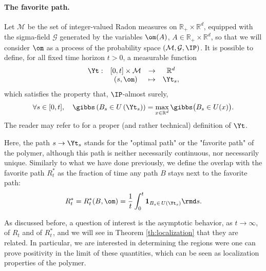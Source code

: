 \medskip
\paragraph{The favorite path.}
Let $\mathcal{M}$ be the set of integer-valued Radon measures on $\mathbb{R}_+\times \mathbb{R}^d$, equipped with the sigma-field $\mathcal G$ generated by the variables $\om(A)$, $A\in \mathbb{R}_+\times \mathbb{R}^d$, so that we will consider $\om$ as a process of the probability space $(\mathcal{M},\mathcal{G},\IP)$.
It is possible to define, for all fixed time horizon $t>0$, a measurable function
\begin{equation} \begin{array}{cccc}
\Yt:&[0,t]\times\mathcal{M} & \to & \mathbb{R}^d\\
&(s,\om) & \mapsto & \Yt_s,
\end{array}
\end{equation}
which satisfies the property that, $\IP$-almost surely,
\begin{equation}
\forall s\in[0,t],\quad \gibbs \left(B_s \in U\left(\Yt_s\right)\right)=\max_{x\in\mathbb{R}^d} \gibbs \big(B_s \in U(x) \big).
\end{equation}
The reader may refer to \cite{CYBMPO2} for a proper (and rather technical) definition of $\Yt$. 

Here, the path $s\to \Yt_s$ stands for the "optimal path" or the "favorite path" of the polymer, although this path is neither necessarily continuous, nor necessarily unique.
Similarly to what we have done previously, we define the overlap with the favorite path $R_t^*$ as the fraction of time any path $B$ stays next to the favorite path:
\begin{equation}
R_t^* = R_t^*(B,\om) = \frac{1}{t} \int_0^t \mathbf{1}_{B_s\in \, U(\Yt_s)} \rmd s.
\end{equation}

As discussed before, a question of interest is the asymptotic behavior, as $t\to\infty$, of $R_t$ and of $R_t^*$, and we will see in Theorem \ref{th:localization} that they are related. In particular, we are interested in determining the regions were one can prove positivity in the limit of these quantities, which can be seen as localization properties of the polymer. 


